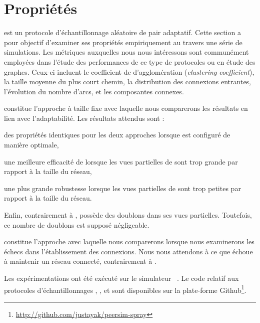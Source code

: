 
\section{Propriétés}

\SPRAY est un protocole d'échantillonnage aléatoire de pair adaptatif. Cette
section a pour objectif d'examiner ses propriétés empiriquement au travers une
série de simulations. Les métriques auxquelles nous nous intéressons sont
communément employées dans l'étude des performances de ce type de protocoles ou
en étude des graphes. Ceux-ci incluent le coefficient de d'agglomération
(\emph{clustering coefficient}), la taille moyenne du plus court chemin, la
distribution des connexions entrantes, l'évolution du nombre d'arcs, et les
composantes connexes.

\CYCLON constitue l'approche à taille fixe avec laquelle nous comparerons les
résultats en lien avec l'adaptabilité. Les résultats attendus sont :
\begin{inparaenum}
\item des propriétés identiques pour les deux approches lorsque \CYCLON est
  configuré de manière optimale,
\item une meilleure efficacité de \SPRAY lorsque les vues partielles de \CYCLON
  sont trop grande par rapport à la taille du réseau,
\item une plus grande robustesse lorsque les vues partielles de \CYCLON sont
  trop petites par rapport à la taille du réseau.
\item Enfin, contrairement à \CYCLON, \SPRAY possède des doublons dans ses vues
  partielles. Toutefois, ce nombre de doublons est supposé négligeable.
\end{inparaenum}
\SCAMP constitue l'approche avec laquelle nous comparerons \SPRAY lorsque nous
examinerons les échecs dans l'établissement des connexions. Nous nous attendons
à ce que \SCAMP échoue à maintenir un réseau connecté, contrairement à \SPRAY.

Les expérimentations ont été exécuté sur le simulateur
\PEERSIM~\cite{montresor2009peersim}. Le code relatif aux protocoles
d'échantillonnages \CYCLON, \SCAMP, et \SPRAY sont disponibles sur la
plate-forme Github\footnote{\url{http://github.com/justayak/peersim-spray}}.

